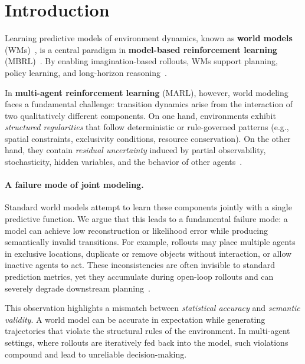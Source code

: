 \documentclass{article}
\theoremstyle{plain}
\theoremstyle{definition}
\theoremstyle{remark}
\begin{document}
\section{Introduction}
\label{sec:intro}

Learning predictive models of environment dynamics, known as \textbf{world models} (WMs)~\cite{ha2018worldmodels}, is a central paradigm in \textbf{model-based reinforcement learning} (MBRL)~\cite{hafner2019learning,hafner2020dreamer,hafner2021dreamerv2}. By enabling imagination-based rollouts, WMs support planning, policy learning, and long-horizon reasoning~\cite{schrittwieser2020}.

In \textbf{multi-agent reinforcement learning} (MARL), however, world modeling faces a fundamental challenge: transition dynamics arise from the interaction of two qualitatively different components. On one hand, environments exhibit \emph{structured regularities} that follow deterministic or rule-governed patterns (e.g., spatial constraints, exclusivity conditions, resource conservation). On the other hand, they contain \emph{residual uncertainty} induced by partial observability, stochasticity, hidden variables, and the behavior of other agents~\cite{Wong2023,Venugopal2024MABL,agravante-etal-2023-learning}.

\paragraph{A failure mode of joint modeling.}
Standard world models attempt to learn these components jointly with a single predictive function. We argue that this leads to a fundamental failure mode: a model can achieve low reconstruction or likelihood error while producing semantically invalid transitions. For example, rollouts may place multiple agents in exclusive locations, duplicate or remove objects without interaction, or allow inactive agents to act. These inconsistencies are often invisible to standard prediction metrics, yet they accumulate during open-loop rollouts and can severely degrade downstream planning~\cite{talvitie2014modelbias,venkatraman2015improving}.

This observation highlights a mismatch between \emph{statistical accuracy} and \emph{semantic validity}. A world model can be accurate in expectation while generating trajectories that violate the structural rules of the environment. In multi-agent settings, where rollouts are iteratively fed back into the model, such violations compound and lead to unreliable decision-making.
\end{document}
